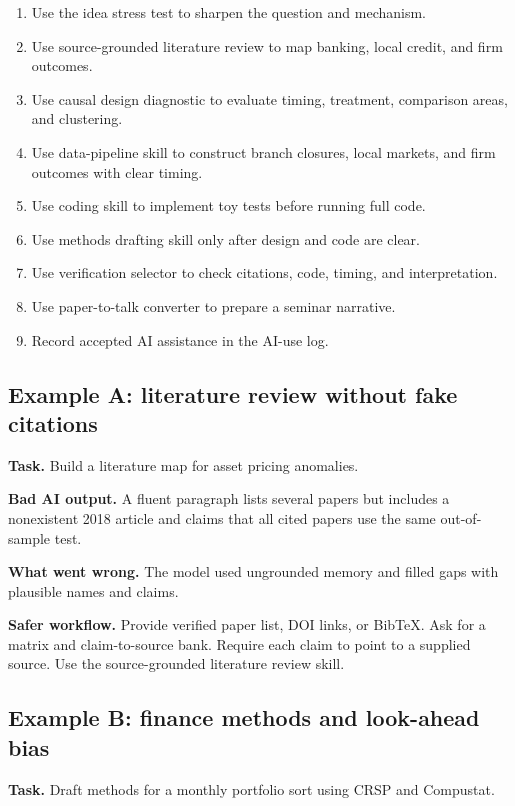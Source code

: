 \documentclass[11pt]{article}
\begin{document}
\begin{enumerate}[leftmargin=2em]
  \item Use the idea stress test to sharpen the question and mechanism.
  \item Use source-grounded literature review to map banking, local credit, and firm outcomes.
  \item Use causal design diagnostic to evaluate timing, treatment, comparison areas, and clustering.
  \item Use data-pipeline skill to construct branch closures, local markets, and firm outcomes with clear timing.
  \item Use coding skill to implement toy tests before running full code.
  \item Use methods drafting skill only after design and code are clear.
  \item Use verification selector to check citations, code, timing, and interpretation.
  \item Use paper-to-talk converter to prepare a seminar narrative.
  \item Record accepted AI assistance in the AI-use log.
\end{enumerate}

\subsection{Example A: literature review without fake citations}

\textbf{Task.} Build a literature map for asset pricing anomalies.

\textbf{Bad AI output.} A fluent paragraph lists several papers but includes a nonexistent 2018 article and claims that all cited papers use the same out-of-sample test.

\textbf{What went wrong.} The model used ungrounded memory and filled gaps with plausible names and claims.

\textbf{Safer workflow.} Provide verified paper list, DOI links, or BibTeX. Ask for a matrix and claim-to-source bank. Require each claim to point to a supplied source. Use the source-grounded literature review skill.

\subsection{Example B: finance methods and look-ahead bias}

\textbf{Task.} Draft methods for a monthly portfolio sort using CRSP and Compustat.
\end{document}
